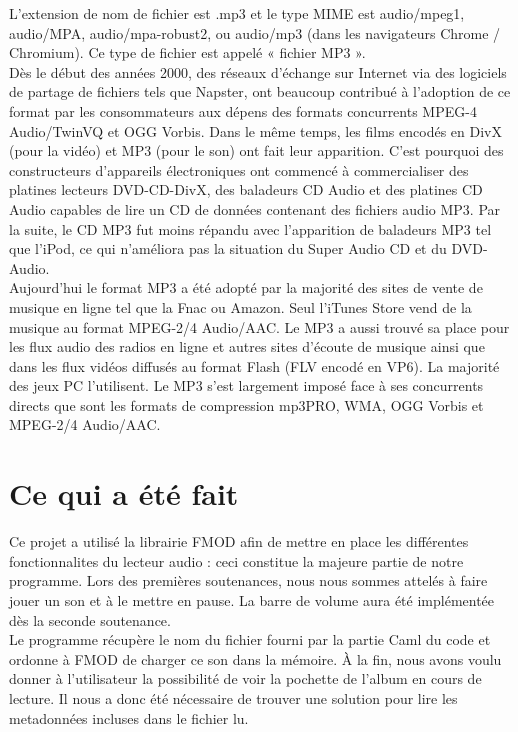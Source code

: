 \documentclass[12pt,a4paper]{report}
\begin{document}
L'extension de nom de fichier est .mp3 et le type MIME est audio/mpeg1, audio/MPA, audio/mpa-robust2, ou audio/mp3 (dans les navigateurs Chrome / Chromium). Ce type de fichier est appelé « fichier MP3 ».\\

Dès le début des années 2000, des réseaux d'échange sur Internet via des logiciels de partage de fichiers tels que Napster, ont beaucoup contribué à l'adoption de ce format par les consommateurs aux dépens des formats concurrents MPEG-4 Audio/TwinVQ et OGG Vorbis. Dans le même temps, les films encodés en DivX (pour la vidéo) et MP3 (pour le son) ont fait leur apparition. C'est pourquoi des constructeurs d'appareils électroniques ont commencé à commercialiser des platines lecteurs DVD-CD-DivX, des baladeurs CD Audio et des platines CD Audio capables de lire un CD de données contenant des fichiers audio MP3. Par la suite, le CD MP3 fut moins répandu avec l'apparition de baladeurs MP3 tel que l'iPod, ce qui n'améliora pas la situation du Super Audio CD et du DVD-Audio.\\

Aujourd'hui le format MP3 a été adopté par la majorité des sites de vente de musique en ligne tel que la Fnac ou Amazon. Seul l'iTunes Store vend de la musique au format MPEG-2/4 Audio/AAC. Le MP3 a aussi trouvé sa place pour les flux audio des radios en ligne et autres sites d'écoute de musique ainsi que dans les flux vidéos diffusés au format Flash (FLV encodé en VP6). La majorité des jeux PC l'utilisent. Le MP3 s'est largement imposé face à ses concurrents directs que sont les formats de compression mp3PRO, WMA, OGG Vorbis et MPEG-2/4 Audio/AAC.\\

\section{Ce qui a été fait}

Ce projet a utilisé la librairie FMOD afin de mettre en place les différentes fonctionnalites du lecteur audio : ceci constitue la majeure partie de notre programme. Lors des premières soutenances, nous nous sommes attelés à faire jouer un son et à le mettre en pause. La barre de volume aura été implémentée dès la seconde soutenance.\\
Le programme récupère le nom du fichier fourni par la partie Caml du code et ordonne à FMOD de charger ce son dans la mémoire.
À la fin, nous avons voulu donner à l'utilisateur la possibilité de voir la pochette de l'album en cours de lecture. Il nous a donc été nécessaire de trouver une solution pour lire les metadonnées incluses dans le fichier lu.\\
\end{document}
